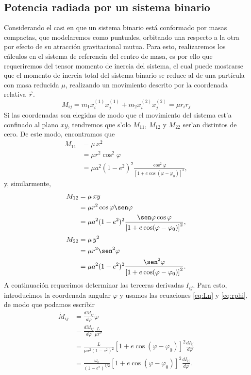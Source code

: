 \subsection{Potencia radiada por un sistema binario}
Considerando el casi en que un sistema binario está conformado por masas compactas, que modelaremos como puntuales,
orbitando una respecto a la otra por efecto de su atracción gravitacional mutua. Para esto, realizaremos los cálculos en el sistema de referencia del centro de masa, es por ello
que requeriremos del tensor momento de inercia del sistema, el cual puede mostrarse que el momento de inercia total del sistema binario se reduce al de una partícula con masa reducida $\mu$, realizando un movimiento
descrito por la coordenada relativa $\vec{r}$.
\begin{equation*}
    M_{ij}=m_1x_i^{(1)}x_{j}^{(1)}+m_2x_i^{(2)}x_{j}^{(2)}=\mu r_ir_j
\end{equation*}
Si las coordenadas son elegidas de modo que el movimiento del sistema est'a confinado al plano $xy$, tendremos que s'olo $M_{11}$, $M_{12}$ y $M_{22}$ ser'an distintos de cero. De este modo, encontramos que
\begin{align*}
M_{11} & = \mu\, x^2\\
& = \mu r^2\cos^2\varphi \\
& = \mu a^2(1-e^2)^2\frac{\cos^2\varphi}{\left[1+e\cos(\varphi-\varphi_0)\right]^2},
\end{align*}
y, similarmente,
\begin{align*}
M_{12} & = \mu\, xy \\
& = \mu r^2\cos\varphi\sen\varphi \\
& = \mu a^2(1-e^2)^2\frac{\sen\varphi\cos\varphi}{\left[1+e\cos(\varphi-\varphi_0)\right]^2},
\end{align*}
\begin{align*}
M_{22} & = \mu\, y^2 \\
& = \mu r^2\sen^2\varphi \\
& = \mu a^2(1-e^2)^2\frac{\sen^2\varphi}{\left[1+e\cos(\varphi-\varphi_0)\right]^2}.
\end{align*}
A continuación requerimos determinar las terceras derivadas $\dddot{I}_{ij}$. Para esto, introducimos la coordenada angular $\varphi$ y usamos las ecuaciones \ref{eq:Ln} y \ref{eq:rphi}, de modo que podamos escribir
\begin{align*}
\dot{M}_{ij} &= \frac{dM_{ij}}{d\varphi}\dot{\varphi} \\
&= \frac{dM_{ij}}{d\varphi}\frac{L}{\mu r^2} \\
&= \frac{L}{\mu a^2(1-e^2)^2}\left[1+e\cos(\varphi-\varphi_0)\right]^2 \frac{dI_{ij}}{d\varphi}\\
&= \frac{\omega_0}{(1-e^2)^{3/2}}\left[1+e\cos(\varphi-\varphi_0)\right]^2 \frac{dI_{ij}}{d\varphi}.
\end{align*}
